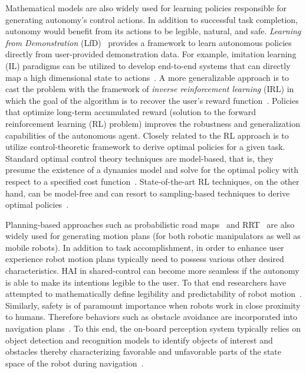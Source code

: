 \documentclass[12pt]{article}
\begin{document}
Mathematical models are also widely used for learning policies responsible for generating autonomy's control actions. In addition to successful task completion, autonomy would benefit from its actions to be legible, natural, and safe. \textit{Learning from Demonstration} (LfD)~\cite{argall2009survey} provides a framework to learn autonomous policies directly from user-provided demonstration data. For example, imitation learning (IL) paradigms can be utilized to develop end-to-end systems that can directly map a high dimensional state to actions~\cite{bojarski2016end}. A more generalizable approach is to cast the problem with the framework of \textit{inverse reinforcement learning} (IRL) in which the goal of the algorithm is to recover the user's reward function~\cite{ziebart2008maximum}.  Policies that optimize long-term accumulated reward (solution to the forward reinforcement learning (RL) problem) improves the robustness and generalization capabilities of the autonomous agent. Closely related to the RL approach is to utilize control-theoretic framework to derive optimal policies for a given task. Standard optimal control theory techniques are model-based, that is, they presume the existence of a dynamics model and solve for the optimal policy with respect to a specified cost function~\cite{kirk1970optimal}. State-of-the-art RL techniques, on the other hand, can be model-free and can resort to sampling-based techniques to derive optimal policies~\cite{watkins1992q}. 

Planning-based approaches such as probabilistic road maps~\cite{kavraki1996analysis} and RRT~\cite{kuffner2000rrt} are also widely used for generating motion plans (for both robotic manipulators as well as mobile robots). In addition to task accomplishment, in order to enhance user experience robot motion plans typically need to possess various other desired characteristics. HAI in shared-control can become more seamless if the autonomy is able to make its intentions legible to the user. To that end researchers have attempted to mathematically define legibility and predictability of robot motion~\cite{dragan2013legibility}. Similarly, safety is of paramount importance when robots work in close proximity to humans. Therefore behaviors such as obstacle avoidance are incorporated into navigation plans~\cite{storms2014blending}. To this end, the on-board perception system typically relies on object detection and recognition models to identify objects of interest and obstacles thereby characterizing favorable and unfavorable parts of the state space of the robot during navigation~\cite{muller2006off}.
\end{document}
